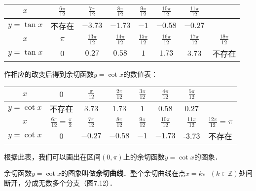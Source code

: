 \begin{center}
\begin{tabular}{c|ccccccc}
\hline
$x$  &    $\frac{6\pi}{12}$  &    $\frac{7\pi}{12}$  &    $\frac{8\pi}{12}$  &    $\frac{9\pi}{12}$  &    $\frac{10\pi}{12}$  &    $\frac{11\pi}{12}$  \\    
\hline
$y=\tan x$   & 不存在  & $-3.73$  & $-1.73$  & $-1$  & $-0.58$  & $-0.27$  \\
\hline
$x$  &    $\pi$  &    $\frac{13\pi}{12}$  &    $\frac{14\pi}{12}$  &    $\frac{15\pi}{12}$  &    $\frac{16\pi}{12}$  &    $\frac{17\pi}{12}$ & $\frac{18\pi}{12}$ \\    
\hline
$y=\tan x$   & 0  & $0.27$  & $0.58$  & $1$  & $1.73$ & 3.73 & 不存在  \\
\hline
\end{tabular}    
\end{center}

作相应的改变后得到余切函数$y=\cot x$的数值表：
\begin{center}
\begin{tabular}{c|ccccccc}
\hline
$x$  &    $0$  &    $\frac{\pi}{12}$  &    $\frac{2\pi}{12}$  &    $\frac{3\pi}{12}$  &    $\frac{4\pi}{12}$  &    $\frac{5\pi}{12}$  \\    
\hline
$y=\cot x$   & 不存在  & $3.73$  & $1.73$  & $1$  & $0.58$  & $0.27$  \\
\hline
$x$  &    $\frac{6\pi}{12}=\frac{\pi}{2}$  &    $\frac{7\pi}{12}$  &    $\frac{8\pi}{12}$  &    $\frac{9\pi}{12}$  &    $\frac{10\pi}{12}$  &    $\frac{11\pi}{12}$ & $\frac{12\pi}{12}=\pi$ \\    
\hline
$y=\cot x$   & 0  & $-0.27$  & $-0.58$  & $-1$  & $-1.73$ & -3.73 & 不存在  \\
\hline
\end{tabular}    
\end{center}

根据此表，我们可以画出在区间$(0,\pi)$上的余切函数$y=\cot x$的图象．

余切函数$y=\cot x$的图象叫做\textbf{余切曲线}．整个余切曲线在点$x=k\pi\;\;(k\in\mathbb{Z})$处间断开，分成无数多个分支（图7.12）．

\begin{figure}[htp]
    \centering
{}
    \caption{}
\end{figure}

